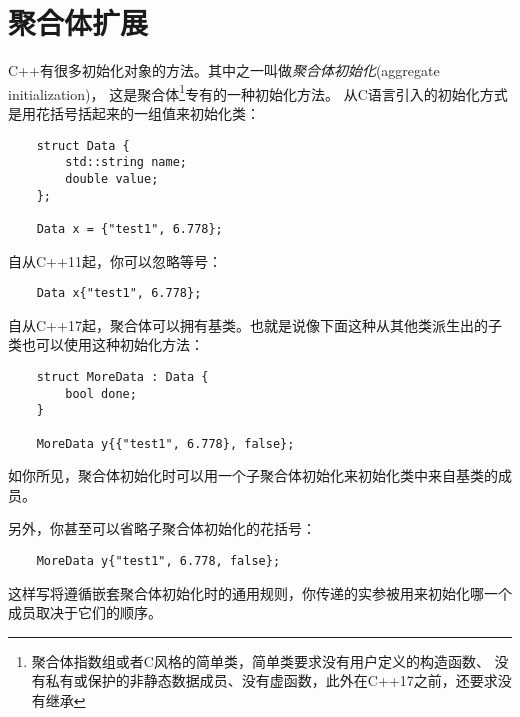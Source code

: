 \section{聚合体扩展}\label{ch4}
C++有很多初始化对象的方法。其中之一叫做\emph{聚合体初始化}(aggregate initialization)，
这是聚合体\footnote{聚合体指数组或者C风格的简单类，简单类要求没有用户定义的构造函数、
没有私有或保护的非静态数据成员、没有虚函数，此外在C++17之前，还要求没有继承}专有的一种初始化方法。
从C语言引入的初始化方式是用花括号括起来的一组值来初始化类：
\begin{lstlisting}
    struct Data {
        std::string name;
        double value;
    };

    Data x = {"test1", 6.778};
\end{lstlisting}
自从C++11起，你可以忽略等号：
\begin{lstlisting}
    Data x{"test1", 6.778};
\end{lstlisting}
自从C++17起，聚合体可以拥有基类。也就是说像下面这种从其他类派生出的子类也可以使用这种初始化方法：
\begin{lstlisting}
    struct MoreData : Data {
        bool done;
    }

    MoreData y{{"test1", 6.778}, false};
\end{lstlisting}
如你所见，聚合体初始化时可以用一个子聚合体初始化来初始化类中来自基类的成员。

另外，你甚至可以省略子聚合体初始化的花括号：
\begin{lstlisting}
    MoreData y{"test1", 6.778, false};
\end{lstlisting}
这样写将遵循嵌套聚合体初始化时的通用规则，你传递的实参被用来初始化哪一个成员取决于它们的顺序。

